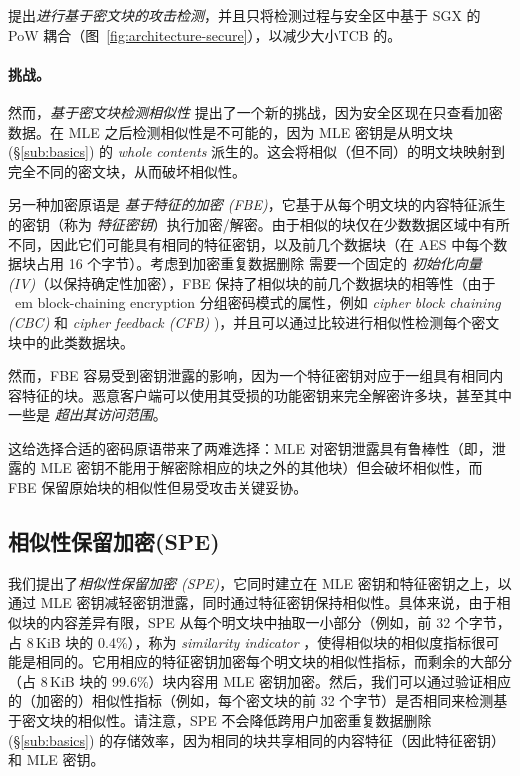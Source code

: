 \sysnameF 提出{\em 进行基于密文块的攻击检测}，并且只将检测过程与安全区中基于 SGX 的 PoW 耦合（图~\ref{fig:architecture-secure}），以减少大小TCB 的。


\paragraph{挑战。}
然而，{\em 基于密文块检测相似性} 提出了一个新的挑战，因为安全区现在只查看加密数据。在 MLE 之后检测相似性是不可能的，因为 MLE 密钥是从明文块 (\S\ref{sub:basics}) 的 {\em whole contents} 派生的。这会将相似（但不同）的明文块映射到完全不同的密文块，从而破坏相似性。

另一种加密原语是 {\em 基于特征的加密 (FBE)}，它基于从每个明文块的内容特征派生的密钥（称为 {\em 特征密钥}）执行加密/解密。由于相似的块仅在少数数据区域中有所不同，因此它们可能具有相同的特征密钥，以及前几个数据块（在 AES 中每个数据块占用 16 个字节）。考虑到加密重复数据删除 \cite{douceur02, shah15} 需要一个固定的 {\em 初始化向量 (IV)}（以保持确定性加密），FBE 保持了相似块的前几个数据块的相等性（由于 {\ em block-chaining encryption} 分组密码模式的属性，例如 {\em cipher block chaining (CBC)} 和 {\em cipher feedback (CFB)} \cite{dworkin01})，并且可以通过比较进行相似性检测每个密文块中的此类数据块。


然而，FBE 容易受到密钥泄露的影响，因为一个特征密钥对应于一组具有相同内容特征的块。恶意客户端可以使用其受损的功能密钥来完全解密许多块，甚至其中一些是 {\em 超出其访问范围}。


这给选择合适的密码原语带来了两难选择：MLE 对密钥泄露具有鲁棒性（即，泄露的 MLE 密钥不能用于解密除相应的块之外的其他块）但会破坏相似性，而 FBE 保留原始块的相似性但易受攻击关键妥协。

\subsection{相似性保留加密(SPE)}
\label{sub:spe}

我们提出了{\em 相似性保留加密 (SPE)}，它同时建立在 MLE 密钥和特征密钥之上，以通过 MLE 密钥减轻密钥泄露，同时通过特征密钥保持相似性。具体来说，由于相似块的内容差异有限，SPE 从每个明文块中抽取一小部分（例如，前 32 个字节，占 8\,KiB 块的 0.4\%），称为 {\em similarity indicator} ，使得相似块的相似度指标很可能是相同的。它用相应的特征密钥加密每个明文块的相似性指标，而剩余的大部分（占 8\,KiB 块的 99.6\%）块内容用 MLE 密钥加密。然后，我们可以通过验证相应的（加密的）相似性指标（例如，每个密文块的前 32 个字节）是否相同来检测基于密文块的相似性。请注意，SPE 不会降低跨用户加密重复数据删除 (\S\ref{sub:basics}) 的存储效率，因为相同的块共享相同的内容特征（因此特征密钥）和 MLE 密钥。

